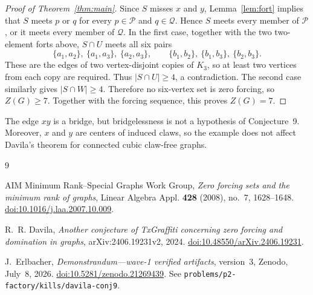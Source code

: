 \documentclass[11pt]{amsart}
\begin{document}
\begin{proof}[Proof of Theorem~\ref{thm:main}]
Since $S$ misses $x$ and $y$, Lemma~\ref{lem:fort} implies that $S$ meets
$p$ or $q$ for every $p\in\mathcal P$ and $q\in\mathcal Q$.  Hence $S$ meets
every member of $\mathcal P$, or it meets every member of $\mathcal Q$.
In the first case, together with the two two-element forts above,
$S\cap U$ meets all six pairs
\[
 \{a_1,a_2\},\ \{a_1,a_3\},\ \{a_2,a_3\},\qquad
 \{b_1,b_2\},\ \{b_1,b_3\},\ \{b_2,b_3\}.
\]
These are the edges of two vertex-disjoint copies of $K_3$, so at least two
vertices from each copy are required.  Thus $|S\cap U|\geq4$, a
contradiction.  The second case similarly gives $|S\cap W|\geq4$.
Therefore no six-vertex set is zero forcing, so $Z(G)\geq7$.  Together with
the forcing sequence, this proves $Z(G)=7$.
\end{proof}

The edge $xy$ is a bridge, but bridgelessness is not a hypothesis of
Conjecture~9.  Moreover, $x$ and $y$ are centers of induced claws, so the
example does not affect Davila's theorem for connected cubic claw-free
graphs.

\begin{thebibliography}{9}

AIM Minimum Rank--Special Graphs Work Group,
\emph{Zero forcing sets and the minimum rank of graphs},
Linear Algebra Appl. \textbf{428} (2008), no.~7, 1628--1648.
\href{https://doi.org/10.1016/j.laa.2007.10.009}
{doi:10.1016/j.laa.2007.10.009}.

R.~R. Davila,
\emph{Another conjecture of TxGraffiti concerning zero forcing and domination
in graphs},
arXiv:2406.19231v2, 2024.
\href{https://doi.org/10.48550/arXiv.2406.19231}
{doi:10.48550/arXiv.2406.19231}.

J.~Erlbacher,
\emph{Demonstrandum---wave-1 verified artifacts},
version~3, Zenodo, July~8, 2026.
\href{https://doi.org/10.5281/zenodo.21269439}
{doi:10.5281/zenodo.21269439}.
See \texttt{problems/p2-factory/kills/davila-conj9}.

\end{thebibliography}
\end{document}
